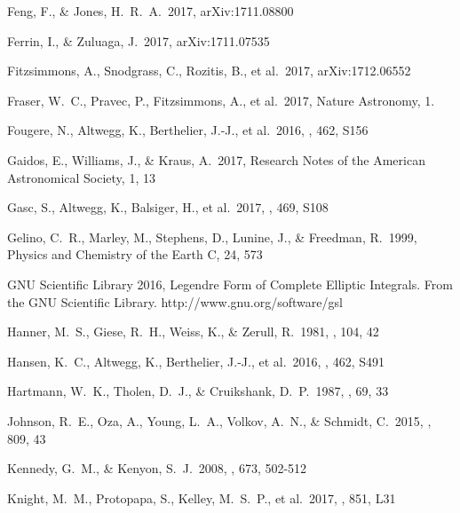 \documentclass[a4paper,fleqn,usenatbib]{mnras}
\begin{document}
\begin{thebibliography}{99}
 Feng, F., \& Jones, H.~R.~A.\ 2017, arXiv:1711.08800

 Ferrin, I., \& Zuluaga, J.\ 2017, arXiv:1711.07535

 Fitzsimmons, A., Snodgrass, C., Rozitis, B., et al.\ 2017, arXiv:1712.06552

 Fraser, W.~C., Pravec, P., Fitzsimmons, A., et al.\ 2017, Nature Astronomy, 1.

 Fougere, N., Altwegg, K., Berthelier, J.-J., et al.\ 2016, \mnras, 462, S156 

 Gaidos, E., Williams, J., \& Kraus, A.\ 2017, Research Notes of the American Astronomical Society, 1, 13

 Gasc, S., Altwegg, K., Balsiger, H., et al.\ 2017, \mnras, 469, S108 

 Gelino, C.~R., Marley, M., Stephens, D., Lunine, J., \& Freedman, R.\ 1999, Physics and Chemistry of the Earth C, 24, 573 

 GNU Scientific Library 2016, Legendre Form of Complete Elliptic Integrals. From the GNU Scientific Library. http://www.gnu.org/software/gsl

 Hanner, M.~S., Giese, R.~H., Weiss, K., \& Zerull, R.\ 1981, \aap, 104, 42 

 Hansen, K.~C., Altwegg, K., Berthelier, J.-J., et al.\ 2016, \mnras, 462, S491 

 Hartmann, W.~K., Tholen, D.~J., \& Cruikshank, D.~P.\ 1987, \icarus, 69, 33 

 Johnson, R.~E., Oza, A., Young, L.~A., Volkov, A.~N., \& Schmidt, C.\ 2015, \apj, 809, 43 

 Kennedy, G.~M., \& Kenyon, S.~J.\ 2008, \apj, 673, 502-512 

 Knight, M.~M., Protopapa, S., Kelley, M.~S.~P., et al.\ 2017, \apjl, 851, L31 


\end{thebibliography}
\end{document}
